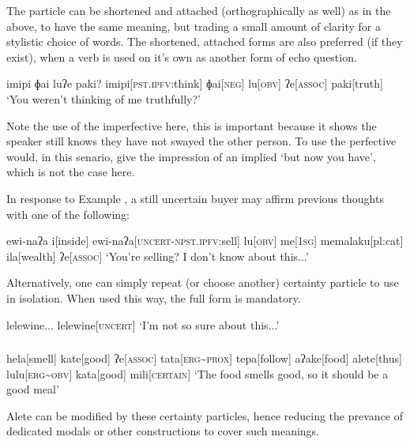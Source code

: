 The particle  can be shortened and attached (orthographically as well) as in the above, to have the same meaning, but trading a small amount of clarity for a stylistic choice of words. The shortened, attached forms are also preferred (if they exist), when a verb is used on it's own as another form of echo question.


\ex
\begingl
\glpreamble imipi ɸai luʔe paki?
\endpreamble
imipi[\textsc{pst.ipfv}:think]
ɸai[\textsc{neg}]
lu[\textsc{obv}]
ʔe[\textsc{assoc}]
paki[truth]
\glft `You weren't thinking of me truthfully?'
\endgl
\xe

Note the use of the imperfective here, this is important because it shows the speaker still knows they have not swayed the other person. To use the perfective would, in this senario, give the impression of an implied `but now you have', which is not the case here.

In response to Example , a still uncertain buyer may affirm previous thoughts with one of the following:

\ex
\begingl
\glpreamble ewi-naʔa
\endpreamble
i[inside]
ewi-naʔa[\textsc{uncert-npst.ipfv:}sell]
lu[\textsc{obv}]
me[\textsc{1sg}]
memalaku[pl:cat]
ila[wealth]
ʔe[\textsc{assoc}]
\glft `You're selling? I don't know about this...'
\endgl
\xe

Alternatively, one can simply repeat (or choose another) certainty particle to use in isolation. When used this way, the full form is mandatory.

\ex
\begingl
\glpreamble lelewine...
\endpreamble
lelewine[\textsc{uncert}]
\glft `I'm not so sure about this...'
\endgl
\xe
\subsubsection{}


\ex
\begingl
\glpreamble
\pronounced{}\endpreamble
\nogloss{\lbrack}
hela[smell]
kate[good]
ʔe[\textsc{assoc}]
tata[\textsc{erg\textasciitilde prox}]
tepa[follow]
aʔake[food]
\nogloss{\rbrack}
alete[thus]
lulu[\textsc{erg\textasciitilde obv}]
kata[good]
mili[\textsc{certain}]
\glft `The food smells good, so it should be a good meal'
\endgl
\xe

Alete can be modified by these certainty particles, hence reducing the prevance of dedicated modals or other constructions to cover such meanings.